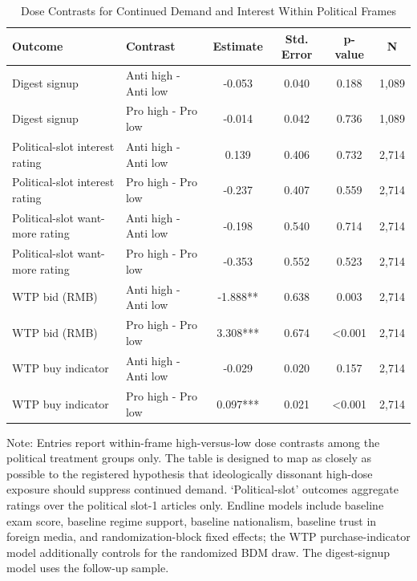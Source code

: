 \begin{table}[H]
\centering
\caption{Dose Contrasts for Continued Demand and Interest Within Political Frames}
\label{tab:dissonant_highdose_demand}
\footnotesize
\begin{threeparttable}
\begin{tabular}{llcccc}
\toprule
Outcome & Contrast & Estimate & Std. Error & p-value & N \\
\midrule
Digest signup & Anti high - Anti low & -0.053 & 0.040 & 0.188 & 1,089 \\
Digest signup & Pro high - Pro low & -0.014 & 0.042 & 0.736 & 1,089 \\
Political-slot interest rating & Anti high - Anti low & 0.139 & 0.406 & 0.732 & 2,714 \\
Political-slot interest rating & Pro high - Pro low & -0.237 & 0.407 & 0.559 & 2,714 \\
Political-slot want-more rating & Anti high - Anti low & -0.198 & 0.540 & 0.714 & 2,714 \\
Political-slot want-more rating & Pro high - Pro low & -0.353 & 0.552 & 0.523 & 2,714 \\
WTP bid (RMB) & Anti high - Anti low & -1.888** & 0.638 & 0.003 & 2,714 \\
WTP bid (RMB) & Pro high - Pro low & 3.308*** & 0.674 & <0.001 & 2,714 \\
WTP buy indicator & Anti high - Anti low & -0.029 & 0.020 & 0.157 & 2,714 \\
WTP buy indicator & Pro high - Pro low & 0.097*** & 0.021 & <0.001 & 2,714 \\
\bottomrule
\end{tabular}
\begin{tablenotes}[flushleft]
\footnotesize
\item Note: Entries report within-frame high-versus-low dose contrasts among the political treatment groups only. The table is designed to map as closely as possible to the registered hypothesis that ideologically dissonant high-dose exposure should suppress continued demand. `Political-slot' outcomes aggregate ratings over the political slot-1 articles only. Endline models include baseline exam score, baseline regime support, baseline nationalism, baseline trust in foreign media, and randomization-block fixed effects; the WTP purchase-indicator model additionally controls for the randomized BDM draw. The digest-signup model uses the follow-up sample.
\end{tablenotes}
\end{threeparttable}
\end{table}
